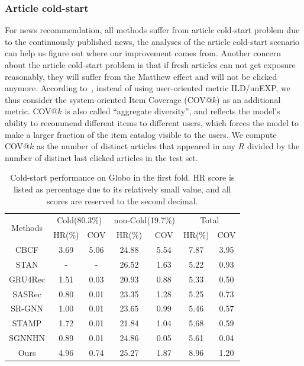 \subsubsection{Article cold-start}
\label{sec:itemcold}
For news recommendation, all methods suffer from article cold-start problem due to the continuously published news, the analyses of the article cold-start scenario can help us 
figure out where our improvement comes from. Another concern about the article cold-start problem is that if fresh articles can not get exposure reasonably, they will suffer from the Matthew effect and will not be clicked anymore. According to~\cite{gabriel2019contextual}, instead of using user-oriented metric ILD/unEXP, we thus consider the system-oriented Item Coverage (COV@$k$) as an additional metric. COV@$k$ is also called ``aggregate diversity'', and reflects the model's ability to recommend different items to different users, which forces the model to make a larger fraction of the item catalog visible to the users. We compute COV@$k$ as the number of distinct articles that appeared in any $R$ divided by the number of distinct last clicked articles in the test set. 
\begin{table}[th]
\caption{Cold-start performance on Globo in the first fold. HR score is  listed as percentage due to its relatively small value, and all scores are reserved to the second decimal.}
\label{tb:cold-start}
\centering
\begin{tabular}{c|c|c|c|c|c|c}
  \toprule
  \multirow{2}{*}{Methods}  & \multicolumn{2}{c|}{Cold(80.3\%)} & \multicolumn{2}{c|}{non-Cold(19.7\%)} & \multicolumn{2}{c}{Total} \\ \cline{2-7} 
    & HR(\%) & COV & HR(\%) & COV & HR(\%) & COV   \\ 
  \midrule
  CBCF & 3.69   & 5.06  &  24.88 & 5.54 & 7.87  & 3.95 \\
  STAN & -  & - &  26.52  &  1.63 & 5.22   & 0.93  \\ 
  \midrule
  GRU4Rec & 1.51  & 0.03  & 20.93 & 0.88 &  5.33  & 0.50 \\
  SASRec & 0.80  & 0.01  & 23.35 & 1.28 & 5.25 & 0.73 \\
  SR-GNN & 1.00  & 0.01  & 23.65 & 0.99  & 5.46 & 0.57\\ 
  STAMP & 1.72 & 0.01 & 21.84  & 1.04 & 5.68 & 0.59 \\
  SGNNHN & 0.89 & 0.01 & 24.86 & 0.05 & 5.61 & 0.04 \\
  \midrule
  Ours & 4.96 & 0.74 & 25.27 & 1.87  & 8.96  & 1.20  \\
  \bottomrule
\end{tabular}
\end{table}


